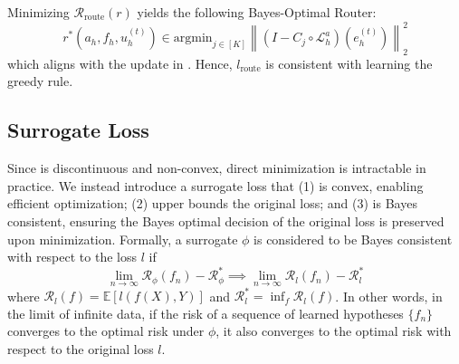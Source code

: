 \documentclass{article}
\begin{document}
Minimizing $\mathcal{R}_{\text{route}}\left(r\right)$ yields the following Bayes-Optimal Router:
\begin{equation}\label{eq:bayesoptimalrouter}
    r^*(a_h, f_h, u^{(t)}_h) \in \text{argmin}_{j \in [K]} \left\|\left( I - C_{j} \circ \mathcal{L}_{h}^a\right)\left(e^{(t)}_h\right)\right\|^2_2
\end{equation} 
which aligns with the update in . Hence, $l_{\text{route}}$ is consistent with learning the greedy rule.

\subsection{Surrogate Loss}\label{section:surrogate}

Since  is discontinuous and non-convex, direct minimization is intractable in practice. We instead introduce a surrogate loss that (1) is convex, enabling efficient optimization; (2) upper bounds the original loss; and (3) is Bayes consistent, ensuring the Bayes optimal decision of the original loss is preserved upon minimization. Formally, a surrogate $\phi$ is considered to be Bayes consistent with respect to the loss $l$ if 
\begin{equation*}
    \lim_{n \to \infty} \mathcal{R}_{\phi}(f_n) - \mathcal{R}_{\phi}^* \implies \lim_{n \to \infty} \mathcal{R}_{l}(f_n) - \mathcal{R}_{l}^* 
\end{equation*}
where $\mathcal{R}_{l}(f) = \mathbb{E}\left[l(f(X), Y)\right]$ and $\mathcal{R}_{l}^* = \inf_f\mathcal{R}_{l}(f)$. In other words, in the limit of infinite data, if the risk of a sequence of learned hypotheses $\{f_n\}$ converges to the optimal risk under $\phi$, it also converges to the optimal risk with respect to the original loss $l$.
\end{document}
